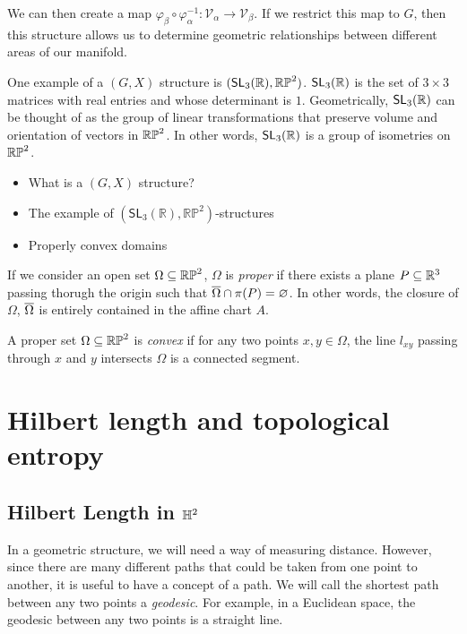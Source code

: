 \documentclass{amsart}
\begin{document}
We can then create a map $\varphi_\beta \circ \varphi_\alpha^{-1} \colon \mathcal{V}_\alpha \to \mathcal{V}_\beta$. If we restrict this map to $G$, then this structure allows us to determine geometric relationships between different areas of our manifold.

One example of a $(G,X)$ structure is $(\mathsf{SL}_3(\mathbb{R}), \mathbb{RP}^2)$. $\mathsf{SL}_3(\mathbb{R})$ is the set of $3\times3$ matrices with real entries and whose determinant is $1$. Geometrically, $\mathsf{SL}_3(\mathbb{R})$ can be thought of as the group of linear transformations that preserve volume and orientation of vectors in $\mathbb{RP}^2$. In other words, $\mathsf{SL}_3(\mathbb{R})$ is a group of isometries on $\mathbb{RP}^2$.


\begin{itemize}
    \item What is a $(G,X)$ structure?
    \item The example of $(\mathsf{SL}_3(\mathbb R),\mathbb{RP}^2)$-structures
    \item Properly convex domains
\end{itemize}

If we consider an open set $\Omega \subseteq \mathbb{RP}^2$, $\Omega$ is \emph{proper} if there exists a plane $P \subseteq \mathbb{R}^3$ passing thorugh the origin such that $\overline{\Omega} \cap \pi(P) = \varnothing$. In other words, the closure of $\Omega$, $\overline{\Omega}$ is entirely contained in the affine chart $A$.

A proper set $\Omega \subseteq \mathbb{RP}^2$ is \emph{convex} if for any two points $x,y \in \Omega$, the line $l_{xy}$ passing through $x$ and $y$ intersects $\Omega$ is a connected segment.


\section{Hilbert length and topological entropy}

\subsection{Hilbert Length in $\mathbb{H}^2$}

In a geometric structure, we will need a way of measuring distance. However, since there are many different paths that could be taken from one point to another, it is useful to have a concept of a  path. We will call the shortest path between any two points a \emph{geodesic}. For example, in a Euclidean space, the geodesic between any two points is a straight line. 
\end{document}

